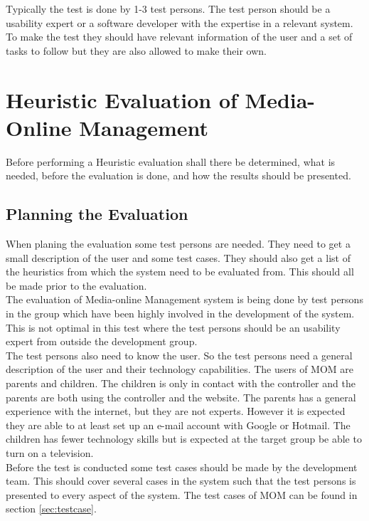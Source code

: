 Typically the test is done by 1-3 test persons\citep{HeuristicEvaluation}. The test person should be a usability expert or a software developer with the expertise in a relevant system. To make the test they should have relevant information of the user and a set of tasks to follow but they are also allowed to make their own.


\section{Heuristic Evaluation of Media-Online Management}
Before performing a Heuristic evaluation shall there be determined, what is needed, before the evaluation is done, and how the results should be presented\citep{HeuristicEvaluationGuide}.

\subsection{Planning the Evaluation}
When planing the evaluation some test persons are needed. They need to get a small description of the user and some test cases. They should also get a list of the heuristics from which the system need to be evaluated from. This should all be made prior to the evaluation. \\

The evaluation of Media-online Management system is being done by test persons in the group which have been highly involved in the development of the system. This is not optimal in this test where the test persons should be an usability expert from outside the development group\citep{DIEB}.\\

The test persons also need to know the user. So the test persons need a general description of the user and their technology capabilities. The users of MOM are parents and children. The children is only in contact with the controller and the parents are both using the controller and the website. The parents has a general experience with the internet, but they are not experts. However it is expected they are able to at least set up an e-mail account with Google or Hotmail. The children has fewer technology skills but is expected at the target group be able to turn on a television. \\

Before the test is conducted some test cases should be made by the development team. This should cover several cases in the system such that the test persons is presented to every aspect of the system. The test cases of MOM can be found in section \vref{sec:testcase}.\\ 


